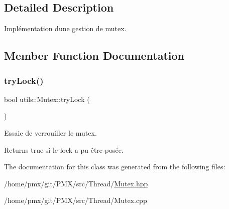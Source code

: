 \subsection{Detailed Description}
Implémentation d\textquotesingle{}une gestion de mutex. 

\subsection{Member Function Documentation}
\mbox{\label{classutils_1_1Mutex_afc40847f9465a3482885099aba452b68}} 
\subsubsection{\texorpdfstring{try\+Lock()}{tryLock()}}
{\footnotesize\ttfamily bool utils\+::\+Mutex\+::try\+Lock (\begin{DoxyParamCaption}{ }\end{DoxyParamCaption})}



Essaie de verrouiller le mutex. 

\begin{DoxyReturn}{Returns}
{\ttfamily true} si le lock a pu être posée. 
\end{DoxyReturn}


The documentation for this class was generated from the following files\+:\begin{DoxyCompactItemize}
\item 
/home/pmx/git/\+P\+M\+X/src/\+Thread/\hyperlink{Mutex_8hpp}{Mutex.\+hpp}\item 
/home/pmx/git/\+P\+M\+X/src/\+Thread/Mutex.\+cpp\end{DoxyCompactItemize}
